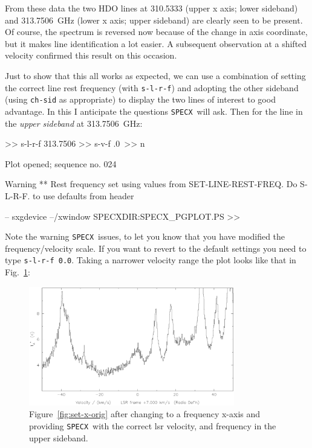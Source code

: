 \documentclass[11pt,twoside]{starlink}
\providecommand{\SPECX}{\texttt{SPECX}}
\begin{document}
From these data the two HDO lines at 310.5333 (upper x axis; lower
sideband) and 313.7506~GHz (lower x axis; upper sideband) are clearly
seen to be present. Of course, the spectrum is reversed now because of
the change in axis coordinate, but it makes line identification a lot
easier. A subsequent observation at a shifted velocity confirmed this
result on this occasion.

Just to show that this all works as expected, we can use a combination
of setting the correct line rest frequency (with \texttt{s-l-r-f}) and
adopting the other sideband (using \texttt{ch-sid} as appropriate) to display
the two
lines of interest to good advantage. In this I anticipate the
questions \SPECX\ will ask. Then for the line in the \textit{upper sideband}
at
313.7506~GHz:
\begin{terminalv}
 >> s-l-r-f 313.7506
 >> s-v-f \y\lsr\rad\7.0\
 >> n

 Plot opened; sequence no. 024

 Warning ** Rest frequency set using values from SET-LINE-REST-FREQ.
 Do S-L-R-F. to use defaults from header

 -- sxgdevice --/xwindow         SPECXDIR:SPECX_PGPLOT.PS
 >>
\end{terminalv}

Note the warning \SPECX\ issues, to let you know that you have
modified the frequency/velocity scale. If you want to revert to the
default settings you need to type \verb|s-l-r-f 0.0|. Taking a
narrower velocity range the plot looks like that in Fig.~\ref{fig:set-to-usb}:

\begin{figure}[ht]
\centering
\includegraphics[width=0.8\textwidth]{sc8_hdo-usb}
\caption[Part of the same in the USB]
{\small{Figure~\ref{fig:set-x-orig} after changing to a frequency
x-axis and providing \SPECX\ with the correct lsr velocity, and
frequency in the upper sideband.
}}
\label{fig:set-to-usb}
\end{figure}
\end{document}
